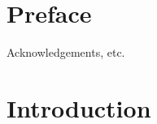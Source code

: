 \documentclass[11pt, a4paper]{article}
\begin{document}
\section*{Preface}

Acknowledgements, etc.

\thispagestyle{empty}

\newpage

\begin{spacing}{0.0}
\tableofcontents
\end{spacing}

\thispagestyle{empty}

\newpage
\setcounter{page}{1}



\section{Introduction}
\label{sec:intro}
\end{document}

